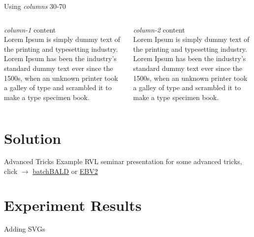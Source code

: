 \documentclass[slidecentered,compress,dvipsnames,table,xcdraw,aspectratio=169]{beamer}
\newcommand{\la}{\textlangle\xspace}
\newcommand{\ra}{\textrangle\xspace}
\begin{document}
\begin{frame}{Using \textit{columns} 30-70}
	\begin{columns}
		\centering
		\la \textit{column-1} content \ra \\
		Lorem Ipsum is simply dummy text of the printing and typesetting industry. Lorem Ipsum has been the industry's standard dummy text ever since the 1500s, when an unknown printer took a galley of type and scrambled it to make a type specimen book.
		
		\centering
		\la \textit{column-2} content \ra \\
		Lorem Ipsum is simply dummy text of the printing and typesetting industry. Lorem Ipsum has been the industry's standard dummy text ever since the 1500s, when an unknown printer took a galley of type and scrambled it to make a type specimen book.

	\end{columns}
\end{frame}

\section{Solution}
\label{sec:solution}

\begin{frame}{Advanced Tricks}
	Example RVL seminar presentation for some advanced tricks, click $\rightarrow$ \href{https://bit.ly/3k8fPEF}{batchBALD} or \href{https://bit.ly/3wkri9g}{EBV2}
\end{frame}

\section{Experiment Results}
\label{sec:exp_results}

\begin{frame}{Adding SVGs}
	\centering
	
\end{frame}

\end{document}
